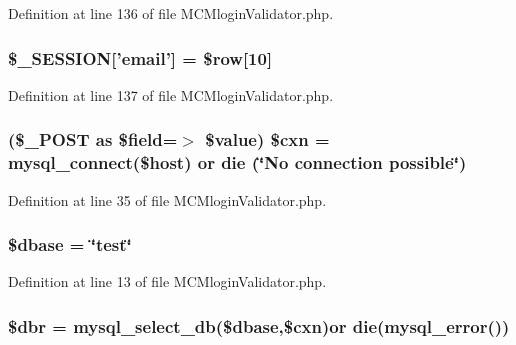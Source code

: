 Definition at line 136 of file M\-C\-Mlogin\-Validator.\-php.

\hypertarget{_m_c_mlogin_validator_8php_ac14cd5920e81ae9195ee7dedc259298e}{
\subsubsection[{\$\-\_\-\-S\-E\-S\-S\-I\-O\-N}]{\setlength{\rightskip}{0pt plus 5cm}\$\-\_\-\-S\-E\-S\-S\-I\-O\-N\mbox{[}'email'\mbox{]} = \$row\mbox{[}10\mbox{]}}}\label{_m_c_mlogin_validator_8php_ac14cd5920e81ae9195ee7dedc259298e}


Definition at line 137 of file M\-C\-Mlogin\-Validator.\-php.

\hypertarget{_m_c_mlogin_validator_8php_a67bdfa000f51c8afb4135092c68cf1d7}{
\subsubsection[{\$cxn}]{ (\$\-\_\-\-P\-O\-S\-T as \$field=$>$ \$value) \$cxn = mysql\-\_\-connect(\$host) or die (\char`\"{}No connection possible\char`\"{})}}\label{_m_c_mlogin_validator_8php_a67bdfa000f51c8afb4135092c68cf1d7}


Definition at line 35 of file M\-C\-Mlogin\-Validator.\-php.

\hypertarget{_m_c_mlogin_validator_8php_abd981912075cb8356ca370b4fefdfed7}{
\subsubsection[{\$dbase}]{\setlength{\rightskip}{0pt plus 5cm}\$dbase = \char`\"{}test\char`\"{}}}\label{_m_c_mlogin_validator_8php_abd981912075cb8356ca370b4fefdfed7}


Definition at line 13 of file M\-C\-Mlogin\-Validator.\-php.

\hypertarget{_m_c_mlogin_validator_8php_a88fea670240e5fa6ae306a286acaa0fd}{
\subsubsection[{\$dbr}]{\setlength{\rightskip}{0pt plus 5cm}\$dbr = mysql\-\_\-select\-\_\-db(\$dbase,\$cxn)or die(mysql\-\_\-error())}}\label{_m_c_mlogin_validator_8php_a88fea670240e5fa6ae306a286acaa0fd}


